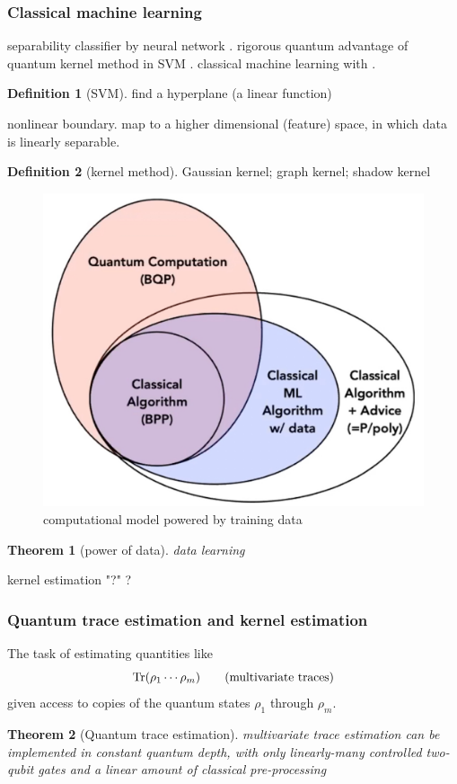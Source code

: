 \documentclass[
aps,
pra,
linenumbers,
floatfix,
]{revtex4-2}
\theoremstyle{plain}
\newtheorem{theorem}{Theorem}
\theoremstyle{definition}
\newtheorem{definition}{Definition}
\begin{document}
\subsubsection{Classical machine learning}\label{sec:classical_machine_learning}
separability classifier by neural network \cite{luSeparabilityEntanglementClassifierMachine2018}.
rigorous quantum advantage of quantum kernel method in SVM \cite{liuRigorousRobustQuantum2021}.
classical machine learning with  \cite{huangProvablyEfficientMachine2021}.
\begin{definition}[SVM]
	find a hyperplane (a linear function)
\end{definition}
nonlinear boundary. map to a higher dimensional (feature) space, in which data is linearly separable.
\begin{definition}[kernel method]\label{def:kernel_method}
	Gaussian kernel; 
	graph kernel;
	shadow kernel
\end{definition}
\begin{figure}[!ht]
	\centering
	\includegraphics[width=.35\linewidth]{data.jpg}
	\caption{computational model powered by training data}
\end{figure}
\begin{theorem}[power of data]
	data learning
\end{theorem}
\begin{algorithm}[H]
    \DontPrintSemicolon
    \BlankLine
     {
        kernel estimation 
    {\Return "?"}
    }
    \Return ?
    \caption{Classical learning (SVM)}
    \label{alg:classical_learning}
\end{algorithm}

\subsubsection{Quantum trace estimation and kernel estimation}
The task of estimating quantities like 
\begin{equation}
	\Tr(\rho_1 \cdots \rho_m)
	\tag{multivariate traces}
\end{equation}
given access to copies of the quantum states $\rho_1$  through $\rho_m$.
\begin{theorem}[Quantum trace estimation]
	\cite{quekMultivariateTraceEstimation2022}
	multivariate trace estimation can be implemented in constant quantum depth, with only linearly-many controlled two-qubit gates and a linear amount of classical pre-processing	
\end{theorem}
\end{document}
